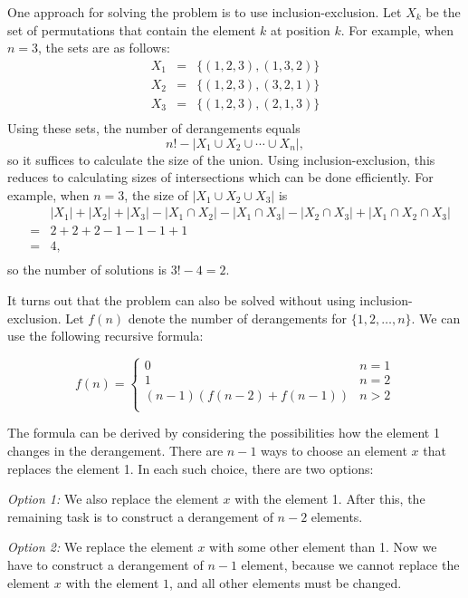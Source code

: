 One approach for solving the problem is to use
inclusion-exclusion.
Let $X_k$ be the set of permutations
that contain the element $k$ at position $k$.
For example, when $n=3$, the sets are as follows:
\[
\begin{array}{lcl}
X_1 & = & \{(1,2,3),(1,3,2)\} \\
X_2 & = & \{(1,2,3),(3,2,1)\} \\
X_3 & = & \{(1,2,3),(2,1,3)\} \\
\end{array}
\]
Using these sets, the number of derangements equals
\[ n! - |X_1 \cup X_2 \cup \cdots \cup X_n|, \]
so it suffices to calculate the size of the union.
Using inclusion-exclusion, this reduces to
calculating sizes of intersections which can be
done efficiently.
For example, when $n=3$, the size of
$|X_1 \cup X_2 \cup X_3|$ is
\[
\begin{array}{lcl}
 & & |X_1| + |X_2| + |X_3| - |X_1 \cap X_2|  - |X_1 \cap X_3|  - |X_2 \cap X_3| + |X_1 \cap X_2 \cap X_3| \\
 & = & 2+2+2-1-1-1+1 \\
 & = & 4, \\
\end{array}
\]
so the number of solutions is $3!-4=2$.

It turns out that the problem can also be solved
without using inclusion-exclusion.
Let $f(n)$ denote the number of derangements
for $\{1,2,\ldots,n\}$. We can use the following
recursive formula:

\begin{equation*}
    f(n) = \begin{cases}
               0               & n = 1\\
               1               & n = 2\\
               (n-1)(f(n-2) + f(n-1)) & n>2 \\
           \end{cases}
\end{equation*}

The formula can be derived by considering
the possibilities how the element 1 changes
in the derangement.
There are $n-1$ ways to choose an element $x$
that replaces the element 1.
In each such choice, there are two options:

\textit{Option 1:} We also replace the element $x$
with the element 1.
After this, the remaining task is to construct
a derangement of $n-2$ elements.

\textit{Option 2:} We replace the element $x$
with some other element than 1.
Now we have to construct a derangement
of $n-1$ element, because we cannot replace
the element $x$ with the element $1$, and all other
elements must be changed.


